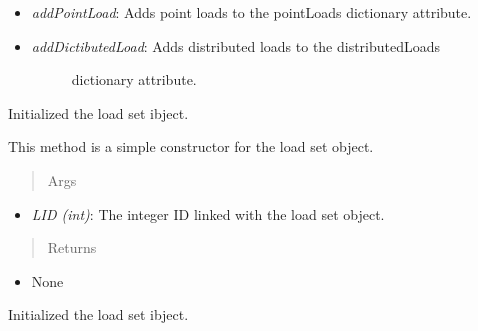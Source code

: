 \documentclass[letterpaper,10pt,english]{sphinxmanual}
\begin{document}
\begin{fulllineitems}
\begin{itemize}
\begin{description}
\end{description}

\item {} 
\emph{addPointLoad}: Adds point loads to the pointLoads dictionary attribute.

\item {} \begin{description}
\item[{\emph{addDictibutedLoad}: Adds distributed loads to the distributedLoads}] \leavevmode
dictionary attribute.

\end{description}

\end{itemize}

\begin{fulllineitems}
\label{FEM:AeroComBAT.FEM.LoadSet.addDistributedLoad}
Initialized the load set ibject.

This method is a simple constructor for the load set object.
\begin{quote}\begin{description}
\item[{Args}] \leavevmode
\end{description}\end{quote}
\begin{itemize}
\item {} 
\emph{LID (int)}: The integer ID linked with the load set object.

\end{itemize}
\begin{quote}\begin{description}
\item[{Returns}] \leavevmode
\end{description}\end{quote}
\begin{itemize}
\item {} 
None

\end{itemize}

\end{fulllineitems}


\begin{fulllineitems}
\label{FEM:AeroComBAT.FEM.LoadSet.addPointLoad}
Initialized the load set ibject.


\end{fulllineitems}
\end{fulllineitems}
\end{document}
